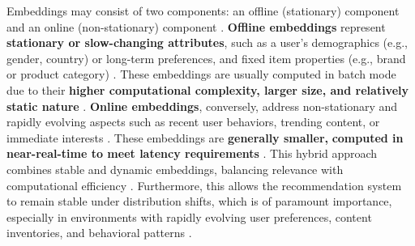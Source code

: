 \documentclass[final]{anthology-ch}         %
\begin{document}


Embeddings may consist of two components: an offline (stationary) component and an online (non-stationary) component \cite{zhao2023embedding}. \textbf{Offline embeddings} represent \textbf{stationary or slow-changing attributes}, such as a user's demographics (e.g., gender, country) or long-term preferences, and fixed item properties (e.g., brand or product category) \cite{koren2009matrix, quadrana2018sequence}. These embeddings are usually computed in batch mode due to their \textbf{higher computational complexity, larger size, and relatively static nature} \cite{naumov2019deep, liu2022monolith}. \textbf{Online embeddings}, conversely, address non-stationary and rapidly evolving aspects such as recent user behaviors, trending content, or immediate interests \cite{Zhou2018, zhou2019deep}. These embeddings are \textbf{generally smaller,} \textbf{computed in near-real-time to meet latency requirements} \cite{liu2022monolith}. This hybrid approach combines stable and dynamic embeddings, balancing relevance with computational efficiency \cite{cheng2016wide, covington2016deep}. Furthermore, this allows the recommendation system to remain stable under distribution shifts, which is of paramount importance, especially in environments with rapidly evolving user preferences, content inventories, and behavioral patterns \cite{gama2014survey, Sutton1998}.
\end{document}
